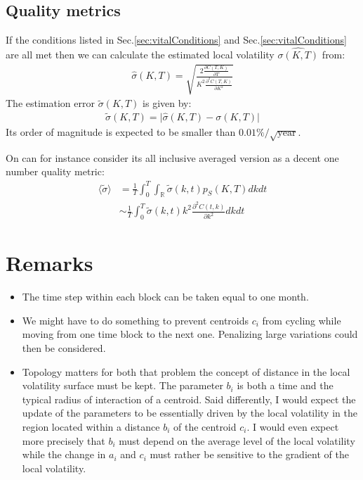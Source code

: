 \documentclass[10pt,a4paper]{article}
\begin{document}
\subsection{Quality metrics}
If the conditions listed in Sec.\ref{sec:vitalConditions} and Sec.\ref{sec:vitalConditions} are all met then we can calculate the estimated local volatility $\hat{\sigma(K,T)}$ from:
\begin{align}
\hat{\sigma} (K,T)= \sqrt{\frac{2\frac{\partial C(T,K)}{\partial T}}{K^2\frac{\partial^2 C(T,K)}{\partial K^2}}}
\end{align}
The estimation error $\tilde{\sigma} (K,T)$ is given by:
\begin{align}
\tilde{\sigma} (K,T) =\vert \hat{\sigma} (K,T) - \sigma(K,T) \vert
\end{align}
Its order of magnitude is expected to be smaller than $0.01\%/\sqrt{\text{year}}$.

On can for instance consider its all inclusive averaged version as a decent one number quality metric:
\begin{align}
\langle\tilde{\sigma}\rangle &= \frac{1}{T} \int_0^T \int_{\mathbb{R}}\tilde{\sigma} (k,t) p_S(K,T) dk dt\\
&\sim \frac{1}{T} \int_0^T \tilde{\sigma} (k,t)  k^2 \frac{\partial^2 C(t,k)}{\partial k^2}  dk dt
\end{align}
\section{Remarks}
\begin{itemize}
\item The time step within each block can be taken equal to one month.
\item We might have to do something to prevent centroids $c_i$ from cycling while moving from one time block to the next one. Penalizing large variations could then be considered.
\item Topology matters for both that problem the concept of distance in the local volatility surface must be kept. The parameter $b_i$ is both a time and the typical radius of interaction of a centroid. Said differently, I would expect the update of the parameters to be essentially driven by the local volatility in the region located within a distance $b_i$ of the centroid $c_i$. I would even expect more precisely that $b_i$ must depend on the average level of the local volatility while the change in $a_i$ and $c_i$ must rather be sensitive to the gradient of the local volatility.
\end{itemize}
\end{document}
